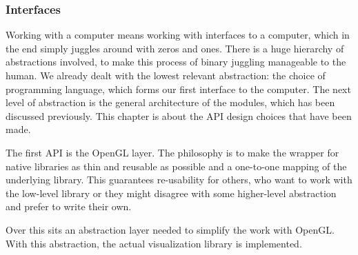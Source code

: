 \subsubsection{Interfaces}

Working with a computer means working with interfaces to a computer, which in the end simply juggles around with zeros and ones. There is a huge hierarchy of abstractions involved, to make this process of binary juggling manageable to the human.
We already dealt with the lowest relevant abstraction: the choice of programming language, which forms our first interface to the computer.
The next level of abstraction is the general architecture of the modules, which has been discussed previously. 
This chapter is about the API design choices that have been made.

The first API is the \ac{OpenGL} layer. 
The philosophy is to make the wrapper for native libraries as thin and reusable as possible and a one-to-one mapping of the underlying library.
This guarantees re-usability for others, who want to work with the low-level library or they might disagree with some higher-level abstraction and prefer to write their own.

Over this sits an abstraction layer needed to simplify the work with \ac{OpenGL}.
With this abstraction, the actual visualization library is implemented.

